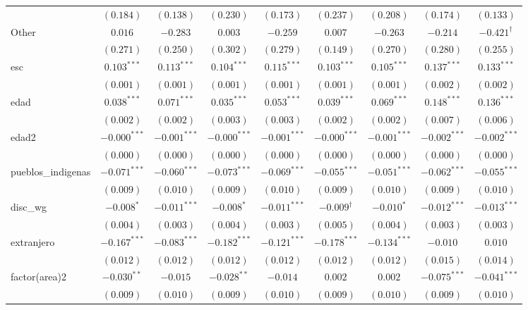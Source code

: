 \begin{landscape}
\begin{longtable}{lcccccccc}
 & $(0.184)$ & $(0.138)$ & $(0.230)$ & $(0.173)$ & $(0.237)$ & $(0.208)$ & $(0.174)$ & $(0.133)$ \\
Other & $0.016$ & $-0.283$ & $0.003$ & $-0.259$ & $0.007$ & $-0.263$ & $-0.214$ & $-0.421^{\dagger}$ \\
 & $(0.271)$ & $(0.250)$ & $(0.302)$ & $(0.279)$ & $(0.149)$ & $(0.270)$ & $(0.280)$ & $(0.255)$ \\
esc & $0.103^{***}$ & $0.113^{***}$ & $0.104^{***}$ & $0.115^{***}$ & $0.103^{***}$ & $0.105^{***}$ & $0.137^{***}$ & $0.133^{***}$ \\
 & $(0.001)$ & $(0.001)$ & $(0.001)$ & $(0.001)$ & $(0.001)$ & $(0.001)$ & $(0.002)$ & $(0.002)$ \\
edad & $0.038^{***}$ & $0.071^{***}$ & $0.035^{***}$ & $0.053^{***}$ & $0.039^{***}$ & $0.069^{***}$ & $0.148^{***}$ & $0.136^{***}$ \\
 & $(0.002)$ & $(0.002)$ & $(0.003)$ & $(0.003)$ & $(0.002)$ & $(0.002)$ & $(0.007)$ & $(0.006)$ \\
edad2 & $-0.000^{***}$ & $-0.001^{***}$ & $-0.000^{***}$ & $-0.001^{***}$ & $-0.000^{***}$ & $-0.001^{***}$ & $-0.002^{***}$ & $-0.002^{***}$ \\
 & $(0.000)$ & $(0.000)$ & $(0.000)$ & $(0.000)$ & $(0.000)$ & $(0.000)$ & $(0.000)$ & $(0.000)$ \\
pueblos\_indigenas & $-0.071^{***}$ & $-0.060^{***}$ & $-0.073^{***}$ & $-0.069^{***}$ & $-0.055^{***}$ & $-0.051^{***}$ & $-0.062^{***}$ & $-0.055^{***}$ \\
 & $(0.009)$ & $(0.010)$ & $(0.009)$ & $(0.010)$ & $(0.009)$ & $(0.010)$ & $(0.009)$ & $(0.010)$ \\
disc\_wg & $-0.008^{*}$ & $-0.011^{***}$ & $-0.008^{*}$ & $-0.011^{***}$ & $-0.009^{\dagger}$ & $-0.010^{*}$ & $-0.012^{***}$ & $-0.013^{***}$ \\
 & $(0.004)$ & $(0.003)$ & $(0.004)$ & $(0.003)$ & $(0.005)$ & $(0.004)$ & $(0.003)$ & $(0.003)$ \\
extranjero & $-0.167^{***}$ & $-0.083^{***}$ & $-0.182^{***}$ & $-0.121^{***}$ & $-0.178^{***}$ & $-0.134^{***}$ & $-0.010$ & $0.010$ \\
 & $(0.012)$ & $(0.012)$ & $(0.012)$ & $(0.012)$ & $(0.012)$ & $(0.012)$ & $(0.015)$ & $(0.014)$ \\
factor(area)2 & $-0.030^{**}$ & $-0.015$ & $-0.028^{**}$ & $-0.014$ & $0.002$ & $0.002$ & $-0.075^{***}$ & $-0.041^{***}$ \\
 & $(0.009)$ & $(0.010)$ & $(0.009)$ & $(0.010)$ & $(0.009)$ & $(0.010)$ & $(0.009)$ & $(0.010)$ \\

\end{longtable}
\end{landscape}

